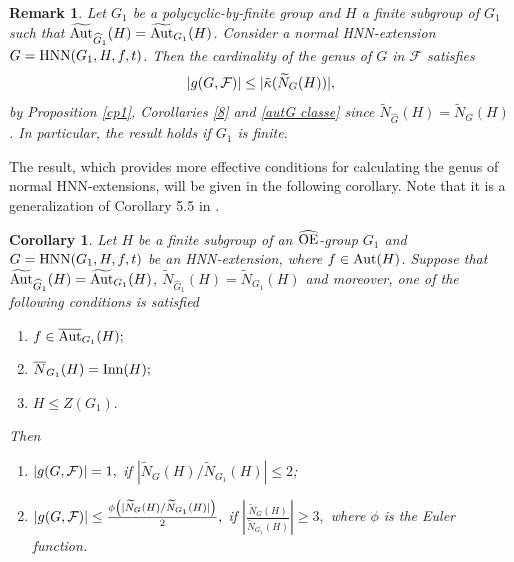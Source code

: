 \documentclass[a4paper,12pt]{article}
\newtheorem{cor}[thm]{Corollary}
\newcommand{\Oe}{\rm \widehat{OE}}
\newcommand{\F}{{\cal F}}
\def\aut {{\rm Aut}}
\def\inn {{\rm Inn}}
\def\hnn {{\rm HNN}}
\newtheorem{rem}[thm]{Remark}
\begin{document}
{\begin{rem} \label{case polycyclic}
Let $G_1$ be a polycyclic-by-finite group and $H$ a finite subgroup of $G_1$ such that $\widetilde{\aut}_{\widehat G_1}(H)= \widetilde{\aut}_{G_1}(H)$. Consider  a normal HNN-extension $G=\hnn(G_1, H, f, t)$. Then the cardinality of the genus of $G$ in $\mathcal{F}$  satisfies $$|g(G, \F)| \leq  | \tilde\kappa( \widetilde{N}_{G}(H))|,$$ by Proposition \ref{cp1},  Corollaries  \ref{8} and \ref{autG classe} since $\widetilde N_{\widehat G}(H)=\widetilde N_{G}(H)$. In particular, the result holds if $G_1$ is finite. 
\end{rem}

The  result, which provides more effective conditions for calculating the genus of normal HNN-extensions, will be given in the following corollary. Note that it is a generalization of Corollary 5.5 in \cite{BZ}.  



\begin{cor} \label{genus cotas faceis}
Let $H$ be a finite subgroup of an $\Oe$-group $G_1$ and $G=\hnn(G_1,H,f,t)$ be an HNN-extension, where $f \in \aut(H)$. Suppose that $\widetilde{\aut}_{\widehat{G}_1}(H)=\widetilde{\aut}_{G_1}(H)$, $\widetilde{N}_{\widehat G_1}(H)=\widetilde{N}_{ G_1}(H)$   and moreover,  one of the following conditions is satisfied \begin{enumerate}
    \item [i)] $f \in \overline{\aut}_{G_1}(H);$

    \item [ii)] $\overline{N}_{ G_1}(H)=\inn(H);$

    \item [iii)] $H \leq Z(G_1).$
\end{enumerate}  
Then \begin{enumerate}    \item [a)] $|g(G, \F)|=1,$ if $|\widetilde{N}_{ G}(H)/\widetilde{N}_{ G_1}(H)|\leq 2$;
    \item [b)] 
 $|g(G, \F)|\leq \frac{\phi\left(|\widetilde{N}_{G}(H)/\widetilde{N}_{G_1}(H)|\right)}{2},$ if $\left| \frac{\widetilde{N}_{ G}(H)}{\widetilde{N}_{ G_1}(H)}\right| \geq 3,$ where $\phi$ is the Euler function.
\end{enumerate} 


\end{cor}}
\end{document}
